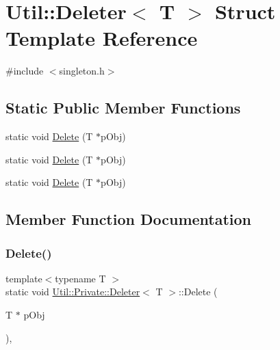 \hypertarget{structUtil_1_1Private_1_1Deleter}{}\section{Util\+:\+:Deleter$<$ T $>$ Struct Template Reference}
\label{structUtil_1_1Private_1_1Deleter}


{\ttfamily \#include $<$singleton.\+h$>$}

\subsection*{Static Public Member Functions}
\begin{DoxyCompactItemize}
\item 
static void \mbox{\hyperlink{structUtil_1_1Private_1_1Deleter_adcc10f3684fbff2ca9a16827f30994b4}{Delete}} (T $\ast$p\+Obj)
\item 
static void \mbox{\hyperlink{structUtil_1_1Private_1_1Deleter_adcc10f3684fbff2ca9a16827f30994b4}{Delete}} (T $\ast$p\+Obj)
\item 
static void \mbox{\hyperlink{structUtil_1_1Private_1_1Deleter_adcc10f3684fbff2ca9a16827f30994b4}{Delete}} (T $\ast$p\+Obj)
\end{DoxyCompactItemize}


\subsection{Member Function Documentation}
\mbox{\label{structUtil_1_1Private_1_1Deleter_adcc10f3684fbff2ca9a16827f30994b4}} 
\subsubsection{\texorpdfstring{Delete()}{Delete()}\hspace{0.1cm}{\footnotesize\ttfamily [1/3]}}
{\footnotesize\ttfamily template$<$typename T $>$ \\
static void \mbox{\hyperlink{structUtil_1_1Private_1_1Deleter}{Util\+::\+Private\+::\+Deleter}}$<$ T $>$\+::Delete (\begin{DoxyParamCaption}\item[{T $\ast$}]{p\+Obj }\end{DoxyParamCaption})\hspace{0.3cm}{\ttfamily [inline]}, {\ttfamily [static]}}

